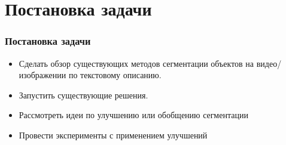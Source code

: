 \section{Постановка задачи}
\begin{frame}
  \frametitle{Постановка задачи}
  \begin{itemize}      
    \item Сделать обзор существующих методов сегментации объектов на видео/изображении по текстовому описанию.
    \item Запустить существующие решения.
    \item Рассмотреть идеи по улучшению или обобщению сегментации
    \item Провести эксперименты с применением улучшений
  
\end{itemize}
\end{frame}